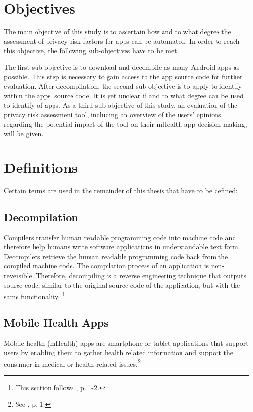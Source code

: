 \documentclass[
	a4paper,
	oneside,
	12pt,
	liststotocnumbered
]{article}
\let\cite\textcite
\begin{document}
\section{Objectives}

The main objective of this study is to ascertain how and to what degree the assessment of privacy risk factors for \mH apps can be automated.
In order to reach this objective, the following sub-objectives have to be met.

The first sub-objective is to download and decompile as many Android apps as possible. This step is necessary to gain access to the app source code for further evaluation.
After decompilation, the second sub-objective is to apply \sca to identify \prfs within the apps' source code. It is yet unclear if and to what degree \sca can be used to identify \prfs of \mH apps.
As a third sub-objective of this study, an evaluation of the privacy risk assessment tool, including an overview of the users’ opinions regarding the potential impact of the tool on their mHealth app decision making, will be given.

\section{Definitions}
Certain terms are used in the remainder of this thesis that have to be defined:

\subsection{Decompilation}

Compilers transfer human readable programming code into machine code and therefore help humans write software applications in understandable text form. 
Decompilers retrieve the human readable programming code back from the compiled machine code. 
The compilation process of an application is non-reversible. Therefore, decompiling is a reverse engineering technique that outputs source code, similar to the original source code of the application, but with the same functionality.  
\footnote{This section follows \cite{nolan2012decompiling}, p. 1-2.}

\subsection{Mobile Health Apps}

Mobile health (\acs{mHealth}) apps are smartphone or tablet applications that support users by enabling them to gather health related information and support the consumer in medical or health related issues.\footnote{See \cite{Dehling2015b}, p. 1.}
\end{document}
